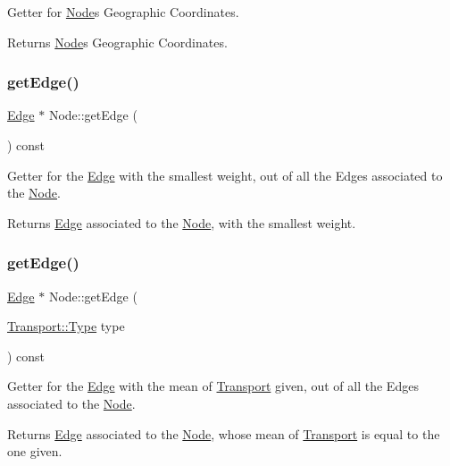 Getter for \hyperlink{class_node}{Node}\textquotesingle{}s Geographic Coordinates.

\begin{DoxyReturn}{Returns}
\hyperlink{class_node}{Node}\textquotesingle{}s Geographic Coordinates. 
\end{DoxyReturn}
\hypertarget{class_node_a108b79d820efdc2768a148e9308b3c31}{}\label{class_node_a108b79d820efdc2768a148e9308b3c31} 
\subsubsection{\texorpdfstring{get\+Edge()}{getEdge()}\hspace{0.1cm}{\footnotesize\ttfamily [1/2]}}
{\footnotesize\ttfamily \hyperlink{class_edge}{Edge} $\ast$ Node\+::get\+Edge (\begin{DoxyParamCaption}{ }\end{DoxyParamCaption}) const}

Getter for the \hyperlink{class_edge}{Edge} with the smallest weight, out of all the Edges associated to the \hyperlink{class_node}{Node}.

\begin{DoxyReturn}{Returns}
\hyperlink{class_edge}{Edge} associated to the \hyperlink{class_node}{Node}, with the smallest weight. 
\end{DoxyReturn}
\hypertarget{class_node_aaf31a7f0f8e4dea82e48b1b09b89c217}{}\label{class_node_aaf31a7f0f8e4dea82e48b1b09b89c217} 
\subsubsection{\texorpdfstring{get\+Edge()}{getEdge()}\hspace{0.1cm}{\footnotesize\ttfamily [2/2]}}
{\footnotesize\ttfamily \hyperlink{class_edge}{Edge} $\ast$ Node\+::get\+Edge (\begin{DoxyParamCaption}\item[{\hyperlink{class_transport_a1879cecfed0d4238e5a7af6d085db317}{Transport\+::\+Type}}]{type }\end{DoxyParamCaption}) const}

Getter for the \hyperlink{class_edge}{Edge} with the mean of \hyperlink{class_transport}{Transport} given, out of all the Edges associated to the \hyperlink{class_node}{Node}.

\begin{DoxyReturn}{Returns}
\hyperlink{class_edge}{Edge} associated to the \hyperlink{class_node}{Node}, whose mean of \hyperlink{class_transport}{Transport} is equal to the one given. 
\end{DoxyReturn}
\hypertarget{class_node_a10a4e5c428f496080172680cb20ea9e0}{}\label{class_node_a10a4e5c428f496080172680cb20ea9e0} 
